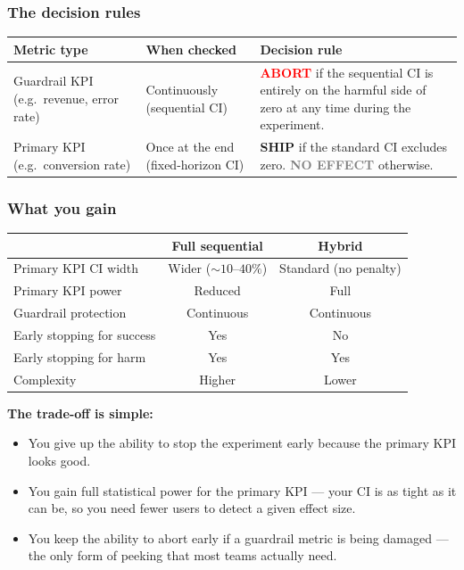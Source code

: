 \documentclass[12pt, a4paper]{article}
\begin{document}
\subsubsection*{The decision rules}

\begin{center}
\renewcommand{\arraystretch}{1.3}
\begin{tabular}{@{} p{4cm} l p{5.5cm} @{}}
\toprule
\textbf{Metric type} & \textbf{When checked} & \textbf{Decision rule} \\
\midrule
Guardrail KPI (e.g.\ revenue, error rate)
  & Continuously (sequential CI)
  & \textcolor{red}{\textbf{ABORT}} if the sequential CI is entirely on the
    harmful side of zero at any time during the experiment. \\[6pt]
Primary KPI (e.g.\ conversion rate)
  & Once at the end (fixed-horizon CI)
  & \textcolor{green!60!black}{\textbf{SHIP}} if the standard CI excludes
    zero.  \textcolor{gray}{\textbf{NO EFFECT}} otherwise. \\
\bottomrule
\end{tabular}
\end{center}

\subsubsection*{What you gain}

\begin{center}
\renewcommand{\arraystretch}{1.3}
\begin{tabular}{@{} l c c @{}}
\toprule
& \textbf{Full sequential} & \textbf{Hybrid} \\
\midrule
Primary KPI CI width & Wider ($\sim\!10$--$40\%$) & Standard (no penalty) \\
Primary KPI power & Reduced & Full \\
Guardrail protection & Continuous & Continuous \\
Early stopping for success & Yes & No \\
Early stopping for harm & Yes & Yes \\
Complexity & Higher & Lower \\
\bottomrule
\end{tabular}
\end{center}

\begin{plainlanguage}
\textbf{The trade-off is simple:}
\begin{itemize}[nosep]
  \item You give up the ability to stop the experiment early because the
        primary KPI looks good.
  \item You gain full statistical power for the primary KPI --- your CI is
        as tight as it can be, so you need fewer users to detect a given
        effect size.
  \item You keep the ability to abort early if a guardrail metric is being
        damaged --- the only form of peeking that most teams actually need.
\end{itemize}
\end{plainlanguage}
\end{document}
